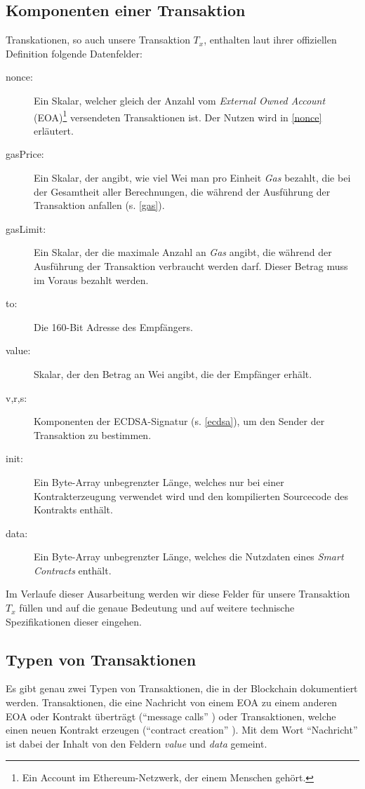 \documentclass[runningheads]{llncs}
\begin{document}
\subsection{Komponenten einer Transaktion}
\label{komponenten}
Transkationen, so auch unsere Transaktion $T_x$, enthalten laut ihrer offiziellen Definition \cite[S. 4]{wood_ethereum/yellowpaper_2019} folgende Datenfelder:
\begin{description}
  \item[nonce:] Ein Skalar, welcher gleich der Anzahl vom \textit{External Owned Account} (EOA)\footnote{Ein Account im Ethereum-Netzwerk, der einem Menschen gehört.} versendeten Transaktionen ist. Der Nutzen wird in \ref{nonce} erläutert.
  \item[gasPrice:] Ein Skalar, der angibt, wie viel Wei man pro Einheit \textit{Gas} bezahlt, die bei der Gesamtheit aller Berechnungen, die während der Ausführung der Transaktion anfallen (s. \ref{gas}).
  \item[gasLimit:] Ein Skalar, der die maximale Anzahl an \textit{Gas} angibt, die während der Ausführung der Transaktion verbraucht werden darf. Dieser Betrag muss im Voraus bezahlt werden.
  \item[to:] Die 160-Bit Adresse des Empfängers.
  \item[value:] Skalar, der den Betrag an Wei angibt, die der Empfänger erhält.
  \item[v,r,s:] Komponenten der ECDSA-Signatur (s. \ref{ecdsa}), um den Sender der Transaktion zu bestimmen.
  \item[init:] Ein Byte-Array unbegrenzter Länge, welches nur bei einer Kontrakterzeugung verwendet wird und den kompilierten Sourcecode des Kontrakts enthält.
  \item[data:] Ein Byte-Array unbegrenzter Länge, welches die Nutzdaten eines \textit{Smart Contracts} enthält.
\end{description}
Im Verlaufe dieser Ausarbeitung werden wir diese Felder für unsere Transaktion $T_x$ füllen und auf die genaue Bedeutung und auf weitere technische Spezifikationen dieser eingehen.


\subsection{Typen von Transaktionen}
\label{types}
Es gibt genau zwei Typen von Transaktionen, die in der Blockchain dokumentiert werden. Transaktionen, die eine Nachricht von einem EOA zu einem anderen EOA oder Kontrakt überträgt ("`message calls"' \cite[S. 4]{wood_ethereum/yellowpaper_2019}) oder Transaktionen, welche einen neuen Kontrakt erzeugen ("`contract creation"' \cite[S. 4]{wood_ethereum/yellowpaper_2019}). Mit dem Wort "`Nachricht"' ist dabei der Inhalt von den Feldern \textit{value} und \textit{data} gemeint.
\end{document}
